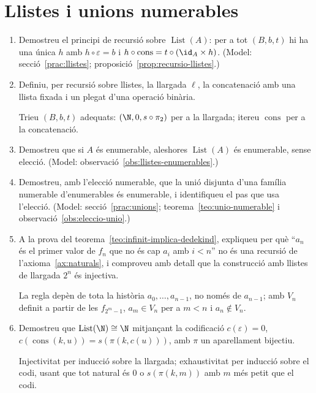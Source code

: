 \section{Llistes i unions numerables}

\begin{enumerate}[resume]
  \item Demostreu el principi de recursió sobre \(\operatorname{List}(A)\): per a tot \((B,b,t)\) hi ha una única \(h\) amb \(h\circ\varepsilon=b\) i \(h\circ\operatorname{cons}=t\circ(\id_A\times h)\). (Model: secció~\ref{prac:llistes}; proposició~\ref{prop:recursio-llistes}.)

  \item Definiu, per recursió sobre llistes, la llargada \(\ell\), la concatenació amb una llista fixada i un plegat d'una operació binària. \begin{indicacio}Trieu \((B,b,t)\) adequats: \((\N,0,s\circ\pi_2)\) per a la llargada; itereu \(\operatorname{cons}\) per a la concatenació.\end{indicacio}

  \item Demostreu que si \(A\) és enumerable, aleshores \(\operatorname{List}(A)\) és enumerable, sense elecció. (Model: observació~\ref{obs:llistes-enumerables}.)

  \item Demostreu, amb l'elecció numerable, que la unió disjunta d'una família numerable d'enumerables és enumerable, i identifiqueu el pas que usa l'elecció. (Model: secció~\ref{prac:unions}; teorema~\ref{teo:unio-numerable} i observació~\ref{obs:eleccio-unio}.)

  \item A la prova del teorema~\ref{teo:infinit-implica-dedekind}, expliqueu per què \enquote{\(a_n\) és el primer valor de \(f_n\) que no és cap \(a_i\) amb \(i<n\)} no és una recursió de l'axioma~\ref{ax:naturals}, i comproveu amb detall que la construcció amb llistes de llargada \(2^n\) és injectiva. \begin{indicacio}La regla depèn de tota la història \(a_0,\dots,a_{n-1}\), no només de \(a_{n-1}\); amb \(V_n\) definit a partir de les \(f_{2^m-1}\), \(a_m\in V_n\) per a \(m<n\) i \(a_n\notin V_n\).\end{indicacio}

  \item Demostreu que \(\operatorname{List}(\N)\cong\N\) mitjançant la codificació \(c(\varepsilon)=0\), \(c(\operatorname{cons}(k,u))=s(\pi(k,c(u)))\), amb \(\pi\) un aparellament bijectiu. \begin{indicacio}Injectivitat per inducció sobre la llargada; exhaustivitat per inducció sobre el codi, usant que tot natural és \(0\) o \(s(\pi(k,m))\) amb \(m\) més petit que el codi.\end{indicacio}


\end{enumerate}
